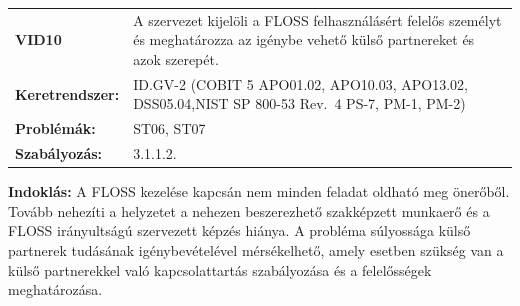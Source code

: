 \documentclass[12pt,magyar,a4paper,oneside]{scrreprt}
\begin{document}
\begin{longtable}[]{@{}ll@{}}
\toprule
\endhead
\begin{minipage}[t]{0.16\columnwidth}\raggedright
\textbf{VID10}\strut
\end{minipage} & \begin{minipage}[t]{0.79\columnwidth}\raggedright
A szervezet kijelöli a FLOSS felhasználásért felelős személyt és
meghatározza az igénybe vehető külső partnereket és azok szerepét.\strut
\end{minipage}\tabularnewline
\begin{minipage}[t]{0.16\columnwidth}\raggedright
\textbf{Keretrendszer:}\strut
\end{minipage} & \begin{minipage}[t]{0.79\columnwidth}\raggedright
ID.GV-2 (COBIT 5 APO01.02, APO10.03, APO13.02, DSS05.04,NIST SP 800-53
Rev.~4 PS-7, PM-1, PM-2)\strut
\end{minipage}\tabularnewline
\begin{minipage}[t]{0.16\columnwidth}\raggedright
\textbf{Problémák:}\strut
\end{minipage} & \begin{minipage}[t]{0.79\columnwidth}\raggedright
ST06, ST07\strut
\end{minipage}\tabularnewline
\begin{minipage}[t]{0.16\columnwidth}\raggedright
\textbf{Szabályozás:}\strut
\end{minipage} & \begin{minipage}[t]{0.79\columnwidth}\raggedright
3.1.1.2.\strut
\end{minipage}\tabularnewline
\bottomrule
\end{longtable}

\textbf{Indoklás: } A FLOSS kezelése kapcsán nem minden feladat oldható
meg önerőből. Tovább nehezíti a helyzetet a nehezen beszerezhető
szakképzett munkaerő és a FLOSS irányultságú szervezett képzés hiánya. A
probléma súlyossága külső partnerek tudásának igénybevételével
mérsékelhető, amely esetben szükség van a külső partnerekkel való
kapcsolattartás szabályozása és a felelősségek meghatározása.
\end{document}
